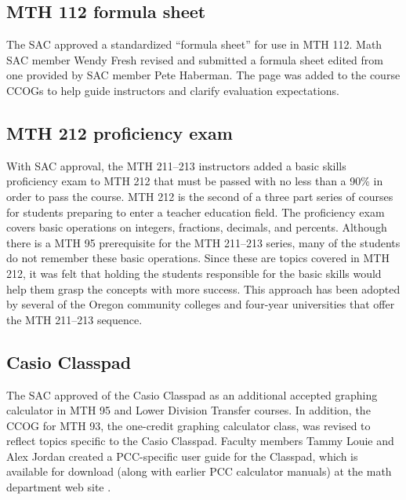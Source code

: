 \subsection{MTH 112 formula sheet}
The SAC approved a standardized ``formula sheet'' for use in MTH 112.  Math SAC
member Wendy Fresh revised and submitted a formula sheet edited from one
provided by SAC member Pete Haberman.  The page was added to the course CCOGs to
help guide instructors and clarify evaluation expectations.
 
\subsection{MTH 212 proficiency exam}
With SAC approval, the MTH 211--213 instructors added a basic skills proficiency
exam to MTH 212 that must be passed with no less than a 90\% in order to pass
the course.  MTH 212 is the second of a three part series of courses for
students preparing to enter a teacher education field. The proficiency exam
covers basic operations on integers, fractions, decimals, and percents.
Although there is a MTH 95 prerequisite for the MTH 211--213 series, many of the
students do not remember these basic operations. Since these are topics covered
in MTH 212, it was felt that holding the students responsible for the basic
skills would help them grasp the concepts with more success.  This approach has
been adopted by several of the Oregon community colleges and four-year
universities that offer the MTH 211--213 sequence.

\subsection{Casio Classpad}
The SAC approved of the Casio Classpad as an additional accepted graphing
calculator in MTH 95 and Lower Division Transfer courses. In addition, the CCOG
for MTH 93, the one-credit graphing calculator class, was revised to reflect topics
specific to the Casio Classpad. Faculty members Tammy Louie and Alex Jordan
created a PCC-specific user guide for the Classpad, which is available for
download (along with earlier PCC calculator manuals) at the math department web
site \cite{pccmathdept}. 

